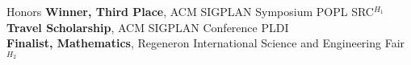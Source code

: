 
\begin{rSection}{Honors}
	\textbf{Winner, Third Place}, ACM SIGPLAN Symposium POPL SRC$^{H_1}$ \hfill \color{darkgray}{2023}
	\color{black}
	\\
	\textbf{Travel Scholarship}, ACM SIGPLAN Conference PLDI \hfill \color{darkgray}{2022}
	\color{black}
	\\
	\textbf{Finalist, Mathematics}, Regeneron International Science and Engineering Fair$^{H_2}$ \hfill \color{darkgray}{2020 \& 2021}
	\color{black} 

\end{rSection} 